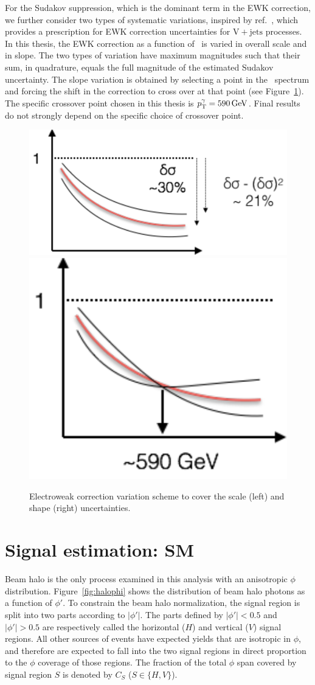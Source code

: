 For the Sudakov suppression, which is the dominant term in the EWK correction, we further
consider two types of systematic variations, inspired by ref.~\cite{ref:epjc/s10052-017-5389-1}, which provides
a prescription for EWK correction uncertainties for $\mathrm{V}+\mathrm{jets}$ processes. In
this thesis, the EWK correction as a function of \pTgamma\ is varied in overall scale and in
slope. The two types of variation have maximum magnitudes such that their sum, in quadrature, equals the full
magnitude of the estimated Sudakov uncertainty. The slope variation is obtained by selecting a point in the \pTgamma\ spectrum and forcing
the shift in the correction to cross over at that point (see Figure~\ref{fig:ewk_correction_cartoon}). The specific crossover
point chosen in this thesis is $\pTgamma = 590\unit{GeV}$. Final results do not strongly depend on the
specific choice of crossover point.

\begin{figure}[htbp]
  \centering
  \includegraphics[height=0.3\linewidth]{Figures/vg/ewk_correction_scale.pdf}
  \includegraphics[height=0.3\linewidth]{Figures/vg/ewk_correction_shape.pdf}
  \caption{
    Electroweak correction variation scheme to cover the scale (left) and shape (right) uncertainties.
  }
  \label{fig:ewk_correction_cartoon}
\end{figure}

\section{Signal estimation: SM} \label{sec:signal_extraction_SM}
Beam halo is the only process examined in this analysis with an anisotropic $\phi$ distribution.
Figure~\ref{fig:halophi} shows the distribution of beam halo photons as a function of $\phi'$.
To constrain the beam halo normalization, the signal region is split into two parts according to $|\phi'|$.
The parts defined by $|\phi'| < 0.5$ and $|\phi'| > 0.5$ are respectively called the horizontal ($H$) and vertical ($V$) signal
regions. All other sources of events have expected yields that are isotropic in $\phi$, and therefore
are expected to fall into the two signal regions in direct proportion to the $\phi$ coverage of those regions.
The fraction of the total $\phi$ span covered by signal region $S$ is denoted by $C_{S}$ ($S \in \{H,V\}$).

